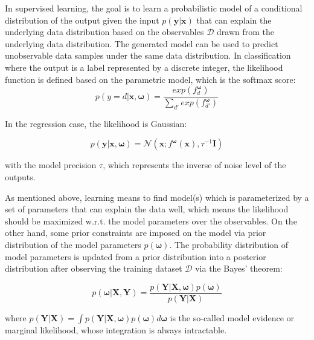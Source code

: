 In supervised learning, the goal is to learn a probabilistic model of a conditional distribution of the output given the input $p(\mathbf{y}|\mathbf{x})$ that can explain the underlying data distribution 
based on the observables $\mathcal{D}$ drawn from the underlying data distribution. 
The generated model can be used to predict unobservable data samples under the same data distribution. In classification where the output is a label represented by a discrete integer, the likelihood function is defined based on the parametric model, which is the softmax score: 
\begin{equation}
p(y = d|\mathbf{x}, \boldsymbol{\omega}) = \frac{exp(f^{\boldsymbol{\omega}}_{d})}{\sum_{d'}exp(f^{\boldsymbol{\omega}}_{d'})}  \label{2.1}
\end{equation}

In the regression case, the likelihood is Gaussian:

\begin{equation}
p(\mathbf{y}|\mathbf{x}, \boldsymbol{\omega}) = \mathcal{N}(\mathbf{x}; f^{\boldsymbol{\omega}}(\mathbf{x}), \tau^{-1}\textbf{I}) 
\label{2.2}
\end{equation}

with the model precision $\tau$, which represents the inverse of noise level of the outputs.

As mentioned above, learning means to find model(s) which is parameterized by a set of parameters that can explain the data well, which means the likelihood should be maximized w.r.t. the model parameters over the observables. On the other hand, some prior constraints are imposed on the model via prior distribution of the model parameters $p(\boldsymbol{\omega})$. The probability distribution of model parameters is updated from a prior distribution into a posterior distribution after observing the training dataset $\mathcal{D}$ via the Bayes' theorem:

\begin{equation}
p(\boldsymbol{\omega}|\mathbf{X}, \mathbf{Y}) = \frac{p(\mathbf{Y}|\mathbf{X}, \boldsymbol{\omega})p(\boldsymbol{\omega})}{p(\mathbf{Y}|\mathbf{X})}
\label{2.3}
\end{equation}

where $p(\mathbf{Y}| \mathbf{X}) = \int p(\mathbf{Y}| \mathbf{X}, \boldsymbol{\omega})p(\boldsymbol{\omega})d\boldsymbol{\omega}$ is the so-called model evidence or marginal likelihood, whose integration is always intractable.

